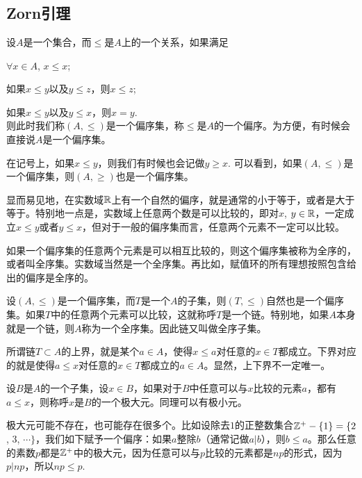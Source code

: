 \appendix
\renewcommand{\thepara}{\Alph{chapter}.\arabic{section}.\arabic{para}}

\chapter{}

\section{Zorn引理}
\para 设$A$是一个集合，而$\leq$是$A$上的一个关系，如果满足

\begin{compactenum}[~~~(1)]
\item $\forall x\in A$, $x\leq x$;
\item 如果$x\leq y$以及$y\leq z$，则$x\leq z$;
\item 如果$x\leq y$以及$y \leq x$，则$x=y$.\\则此时我们称$(A,\leq)$是一个偏序集，称$\leq$是$A$的一个偏序。为方便，有时候会直接说$A$是一个偏序集。
\end{compactenum}

在记号上，如果$x\leq y$，则我们有时候也会记做$y\geq x$. 可以看到，如果$(A,\leq)$是一个偏序集，则$(A,\geq)$也是一个偏序集。

显而易见地，在实数域$\mathbb{R}$上有一个自然的偏序，就是通常的小于等于，或者是大于等于。特别地一点是，实数域上任意两个数是可以比较的，即对$x$, $y\in \mathbb{R}$，一定成立$x\leq y$或者$y\leq x$，但对于一般的偏序集而言，任意两个元素不一定可以比较。

如果一个偏序集的任意两个元素是可以相互比较的，则这个偏序集被称为全序的，或者叫全序集。实数域当然是一个全序集。再比如，赋值环的所有理想按照包含给出的偏序是全序的。

\para 设$(A,\leq)$是一个偏序集，而$T$是一个$A$的子集，则$(T,\leq)$自然也是一个偏序集。如果$T$中的任意两个元素可以比较，这就称呼$T$是一个链。特别地，如果$A$本身就是一个链，则$A$称为一个全序集。因此链又叫做全序子集。

\para 所谓链$T\subset A$的上界，就是某个$a\in A$，使得$x\leq a$对任意的$x\in T$都成立。下界对应的就是使得$a\leq x$对任意的$x\in T$都成立的$a\in A$。显然，上下界不一定唯一。

\para 设$B$是$A$的一个子集，设$x\in B$，如果对于$B$中任意可以与$x$比较的元素$a$，都有$a\leq x$，则称呼$x$是$B$的一个极大元。同理可以有极小元。

极大元可能不存在，也可能存在很多个。比如设除去$1$的正整数集合$\mathbb{Z}^+-\{1\}=\{2$, $3$, $\cdots\}$，我们如下赋予一个偏序：如果$a$整除$b$（通常记做$a|b$），则$b\leq a$。那么任意的素数$p$都是$\mathbb{Z}^+$中的极大元，因为任意可以与$p$比较的元素都是$np$的形式，因为$p|np$，所以$np\leq p$.

